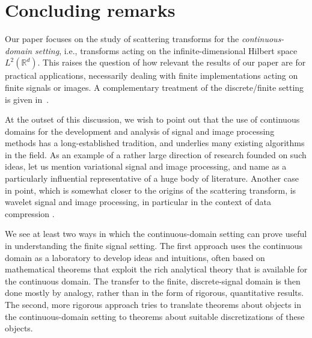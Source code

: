 \documentclass[11pt]{amsart}
\newcommand{\R}{{\mathbb{R}}}
\newenvironment{proof sketch} {\textit{Proof sketch.}}{}
\begin{document}
  \section{Concluding remarks}\label{sec: Concluding remarks}

  Our paper focuses on the study of scattering transforms for the \textit{continuous-domain setting}, i.e., transforms acting on the infinite-dimensional Hilbert space $L^2(\R^d)$. This raises the question of how relevant the results of our paper are for practical applications, necessarily dealing with finite implementations acting on finite signals or images. A complementary treatment of the discrete/finite setting is given in~\cite{getter2025digital}.
  
  At the outset of this discussion, we wish to point out that the use of continuous domains for the development and analysis of signal and image processing methods has a long-established tradition, and underlies many existing algorithms in the field. As an example of a rather large direction of research founded on such ideas, let us mention variational signal and image processing, and name \cite{rudin1992nonlinear} as a particularly influential representative of a huge body of literature. Another case in point, which is somewhat closer to the origins of the scattering transform, is wavelet signal and image processing, in particular in the context of data compression \cite{deVore1992image,donoho1998data}.

  We see at least two ways in which the continuous-domain setting can prove useful in understanding the finite signal setting. The first approach uses the continuous domain as a laboratory to develop ideas and intuitions, often based on mathematical theorems that exploit the rich analytical theory that is available for the continuous domain. The transfer to the finite, discrete-signal domain is then done mostly by analogy, rather than in the form of rigorous, quantitative results. The second, more rigorous approach tries to translate theorems about objects in the continuous-domain setting to theorems about suitable discretizations of these objects.
  
\end{document}
